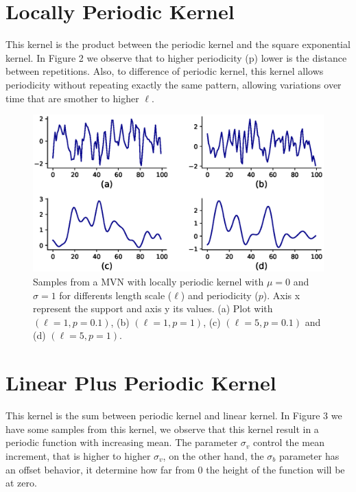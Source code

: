 \documentclass{article}
\begin{document}
\section{Locally Periodic Kernel}

This kernel is the product between the periodic kernel and the square exponential kernel. In Figure 2 we observe that to higher periodicity (p) lower is the distance between repetitions. Also, to difference of periodic kernel, this kernel allows periodicity without repeating exactly the same pattern, allowing variations over time that are smother to higher $\ell$.

\begin{figure}[h]
\centering
\includegraphics[scale=0.45]{img/locally_periodic.eps}  
\caption{Samples from a MVN with locally periodic kernel with $\mu=0$ and $\sigma=1$ for differents length scale ($\ell$) and periodicity ($p$). Axis x represent the support and axis y its values. (a) Plot with $(\ell=1, p=0.1 )$, (b) $(\ell=1, p=1)$, (c) $(\ell=5, p=0.1)$ and (d) $(\ell=5, p=1)$.}
\end{figure}



\section{Linear Plus Periodic Kernel}
This kernel is the sum between periodic kernel and linear kernel. In Figure 3 we have some samples from this kernel, we observe that this kernel result in a periodic function with increasing mean. The parameter $\sigma_{v}$ control the mean increment, that is higher to higher $\sigma_{v}$, on the other hand, the $\sigma_{b}$ parameter has an offset behavior, it determine how far from 0 the height of the function will be at zero.
\end{document}
